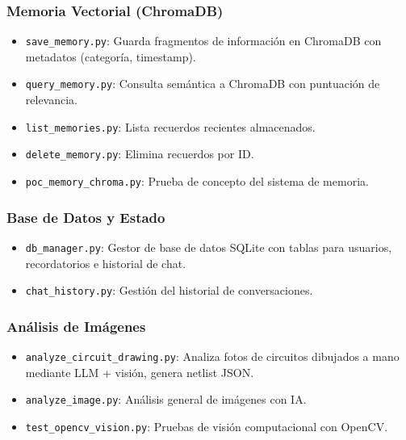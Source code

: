 \documentclass[12pt, a4paper]{article}
\begin{document}
\subsubsection*{Memoria Vectorial (ChromaDB)}
\begin{itemize}[leftmargin=*]
    \item \texttt{save\_memory.py}: Guarda fragmentos de información en ChromaDB con metadatos (categoría, timestamp).
    \item \texttt{query\_memory.py}: Consulta semántica a ChromaDB con puntuación de relevancia.
    \item \texttt{list\_memories.py}: Lista recuerdos recientes almacenados.
    \item \texttt{delete\_memory.py}: Elimina recuerdos por ID.
    \item \texttt{poc\_memory\_chroma.py}: Prueba de concepto del sistema de memoria.
\end{itemize}

\subsubsection*{Base de Datos y Estado}
\begin{itemize}[leftmargin=*]
    \item \texttt{db\_manager.py}: Gestor de base de datos SQLite con tablas para usuarios, recordatorios e historial de chat.
    \item \texttt{chat\_history.py}: Gestión del historial de conversaciones.
\end{itemize}

\subsubsection*{Análisis de Imágenes}
\begin{itemize}[leftmargin=*]
    \item \texttt{analyze\_circuit\_drawing.py}: Analiza fotos de circuitos dibujados a mano mediante LLM + visión, genera netlist JSON.
    \item \texttt{analyze\_image.py}: Análisis general de imágenes con IA.
    \item \texttt{test\_opencv\_vision.py}: Pruebas de visión computacional con OpenCV.
\end{itemize}
\end{document}
